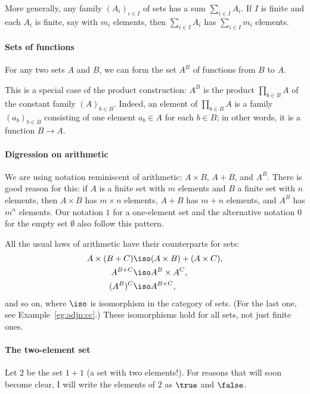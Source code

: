 More generally, any family $(A_i)_{i \in I}$ of sets has a sum $\sum_{i \in
I} A_i$.%
%
%
If $I$ is finite and each $A_i$ is finite, say with $m_i$
elements, then $\sum_{i \in I} A_i$ has $\sum_{i \in I} m_i$ elements.

\paragraph*{Sets of functions}  
%
%
%
For any two sets $A$ and $B$, we can form the set $A^B$%
%
%
 of functions from $B$ to $A$.  

This is a special case of the product construction: $A^B$ is the product
$\prod_{b \in B} A$ of the constant family $(A)_{b \in B}$.  Indeed, an
element of $\prod_{b \in B} A$ is a family $(a_b)_{b \in B}$ consisting of
one element $a_b \in A$ for each $b \in B$; in other words, it is a function
$B \to A$.

\paragraph*{Digression on arithmetic}%
\label{p:arith}
%
% 
We are using notation reminiscent of arithmetic: $A \times B$, $A + B$, and
$A^B$.  There is good reason for this: if $A$ is a finite set with $m$
elements and $B$ a finite set with $n$ elements, then $A \times B$ has $m
\times n$ elements, $A + B$ has $m + n$ elements, and $A^B$ has $m^n$
elements.  Our notation $1$ for a one-element set and the alternative
notation $0$ for the empty set $\emptyset$ also follow this pattern.

All the usual laws of arithmetic have their counterparts for sets:
% 
\begin{align*}
A \times (B + C)        &\iso (A \times B) + (A \times C),      \\
A^{B + C}               &\iso A^B \times A^C,                   \\
(A^B)^C                 &\iso A^{B \times C},
\end{align*}
% 
and so on, where $\iso$ is isomorphism in the category of sets.  (For the
last one, see Example~\ref{eg:adjn:cc}.)  These isomorphisms hold for all
sets, not just finite ones.

\paragraph*{The two-element set}  
%
%
Let $2$%
%
%
be the set $1 + 1$ (a set with two elements!).  For reasons that will soon
become clear, I will write the elements of $2$ as $\true$ and $\false$.

